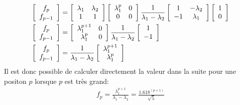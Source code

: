 \begin{align}
\left[ \begin{array}{c}  
f_p \\ f_{p-1}
\end{array} \right]
&= 
\left[ \begin{array}{c c }  
\lambda_1 & \lambda_2 \\
1         & 1 \\
\end{array} \right]
\left[ \begin{array}{c c }  
\lambda_1^p & 0 \\
0         & 0 \\
\end{array} \right]
\frac{1}{\lambda_1 - \lambda_2}
\left[ \begin{array}{c c }  
1 & -\lambda_2 \\
-1         & \lambda_1 \\
\end{array} \right] 
\left[ \begin{array}{c}  
1 \\ 0
\end{array} \right]
\\
\left[ \begin{array}{c}  
f_p \\ f_{p-1}
\end{array} \right]
&= 
\left[ \begin{array}{c c}  
\lambda_1^{p+1} & 0 \\
\lambda_1^{p}  & 0\\
\end{array} \right]
\frac{1}{\lambda_1 - \lambda_2}
\left[ \begin{array}{c }  
1  \\
-1   \\
\end{array} \right] 
\\
\left[ \begin{array}{c}  
f_p \\ f_{p-1}
\end{array} \right]
&= 
\frac{1}{\lambda_1 - \lambda_2}
\left[ \begin{array}{c}  
\lambda_1^{p+1}\\
\lambda_1^{p} \\
\end{array} \right] 
\end{align}
Il est donc possible de calculer directement la valeur dans la suite pour une positon $p$ lorsque $p$ est très grand:
\begin{align}
f_p = \frac{\lambda_1^{p+1}}{\lambda_1 - \lambda_2} = \frac{1.618^{(p+1)}}{\sqrt{5}}
\end{align}

